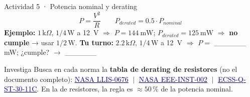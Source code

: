 \documentclass[aspectratio=169]{beamer}
\newcommand{\enlace}[2]{\href{#1}{\textcolor{navy}{\underline{#2}}}}
\begin{document}
\begin{frame}{Actividad 5 · Potencia nominal y derating}
  \[
    P = \frac{V^2}{R}
    \qquad
    P_{derated} = 0.5\cdot P_{nominal}
  \]
  \textbf{Ejemplo:} $1\,\text{k}\Omega$, $1/4\,\text{W}$ a \SI{12}{\volt} $\Rightarrow$
  $P=\SI{144}{\milli\watt}$; $P_{derated}=\SI{125}{\milli\watt}$ $\Rightarrow$ \textbf{no cumple} → usar $1/2\,\text{W}$.
  \pause
  \vspace{0.4em}
  \textbf{Tu turno:} $2.2\,\text{k}\Omega$, $1/4\,\text{W}$ a \SI{12}{\volt} $\Rightarrow$
  $P=$ \_\_\_\_\_\_ mW; ¿cumple? $\rightarrow$ \_\_\_\_\_\_

  \pause
  \begin{block}{Investiga}
    \small
    Busca en cada norma la \textbf{tabla de derating de resistores} (no el documento completo):
    \enlace{https://llis.nasa.gov/lesson/676}{NASA LLIS-0676}
    $\;|\;$ \enlace{https://snebulos.mit.edu/projects/reference/NASA-Generic/EEE-INST-002-DeratingPages.pdf}{NASA EEE-INST-002}
    $\;|\;$ \enlace{https://ecss.nl/standard/ecss-q-st-30-11c-derating-eee-components/}{ECSS-Q-ST-30-11C}.
    En la de resistores, la regla es $\approx 50\,\text{\%}$ de la potencia nominal.
  \end{block}
\end{frame}
\end{document}
